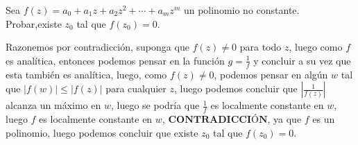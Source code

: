 \begin{homeworkProblem}
  Sea $f(z) = a_0+a_1z+a_2z^2+\cdots+a_mz^m$ un polinomio no constante. Probar,existe $z_0$ tal que $f(z_0)=0$.
  \begin{solution}
    Razonemos por contradicción, suponga que $f(z)\neq 0$ para todo $z$, luego como $f$ es analítica, entonces podemos pensar en la función $g=\frac{1}{f}$ y concluir a su vez que esta también es analítica, luego, como $f(z)\neq 0$, podemos pensar en algún $w$ tal que $|f(w)|\leq |f(z)|$ para cualquier $z$, luego podemos concluir que $\left| \frac{1}{f(z)} \right|$ alcanza un máximo en $w$, luego se podría que $\frac{1}{f}$ es localmente constante en $w$, luego $f$ es localmente constante en $w$, $\textbf{CONTRADICCIÓN}$, ya que $f$ es un polinomio, luego podemos concluir que existe $z_0$ tal que $f(z_0)=0$.
    \demostrado
  \end{solution}
\end{homeworkProblem}
